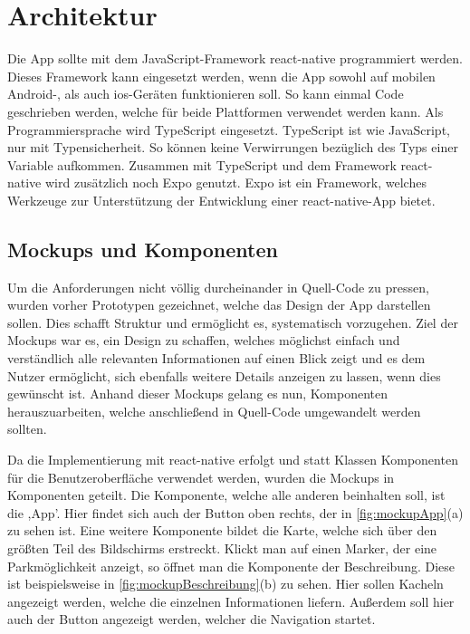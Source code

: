 \chapter{Architektur}

Die App sollte mit dem JavaScript-Framework react-native programmiert werden. Dieses Framework kann eingesetzt werden, wenn die App sowohl auf mobilen Android-, als auch ios-Geräten funktionieren soll. So kann einmal Code geschrieben werden, welche für beide Plattformen verwendet werden kann. Als Programmiersprache wird TypeScript eingesetzt. TypeScript ist wie JavaScript, nur mit Typensicherheit. So können keine Verwirrungen bezüglich des Typs einer Variable aufkommen. Zusammen mit TypeScript und dem Framework react-native wird zusätzlich noch Expo genutzt. Expo ist ein Framework, welches Werkzeuge zur Unterstützung der Entwicklung einer react-native-App bietet. 

\section{Mockups und Komponenten}
Um die Anforderungen nicht völlig durcheinander in Quell-Code zu pressen, wurden vorher Prototypen gezeichnet, welche das Design der App darstellen sollen. Dies schafft Struktur und ermöglicht es, systematisch vorzugehen. Ziel der Mockups war es, ein Design zu schaffen, welches möglichst einfach und verständlich alle relevanten Informationen auf einen Blick zeigt und es dem Nutzer ermöglicht, sich ebenfalls weitere Details anzeigen zu lassen, wenn dies gewünscht ist. Anhand dieser Mockups gelang es nun, Komponenten herauszuarbeiten, welche anschließend in Quell-Code umgewandelt werden sollten.

Da die Implementierung mit react-native erfolgt und statt Klassen Komponenten für die Benutzeroberfläche verwendet werden, wurden die Mockups in Komponenten geteilt. Die Komponente, welche alle anderen beinhalten soll, ist die ,App'. Hier findet sich auch der Button oben rechts, der in \autoref{fig:mockupApp}(a) zu sehen ist. Eine weitere Komponente bildet die Karte, welche sich über den größten Teil des Bildschirms erstreckt. Klickt man auf einen Marker, der eine Parkmöglichkeit anzeigt, so öffnet man die Komponente der Beschreibung. Diese ist beispielsweise in \autoref{fig:mockupBeschreibung}(b) zu sehen. Hier sollen Kacheln angezeigt werden, welche die einzelnen Informationen liefern. Außerdem soll hier auch der Button angezeigt werden, welcher die Navigation startet. 

